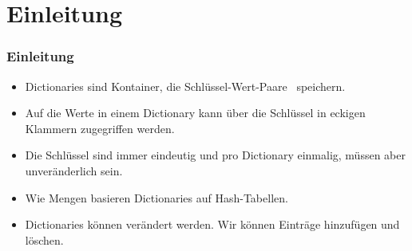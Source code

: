 \documentclass[aspectratio=169,mathserif,notheorems]{beamer}%
\subtitle{21.~Dictionaries bzw.\ Hash Maps}%
\begin{document}
%
%
\startPresentation%
%
\section{Einleitung}%
\begin{frame}[t]%
\frametitle{Einleitung}%
%
\begin{itemize}%
\item Dictionaries sind Kontainer, die Schlüssel-Wert-Paare~ speichern.%
%
\item<2-> Auf die Werte in einem Dictionary kann über die Schlüssel in eckigen Klammern zugegriffen werden.%
%
\item<3-> Die Schlüssel sind immer eindeutig und pro Dictionary einmalig, müssen aber unveränderlich sein.%
%
\item<5-> Wie Mengen basieren Dictionaries auf Hash-Tabellen\cite{K1998SAS,CLRS2009ITA,SKS2019DSC}.
%
\item<6-> Dictionaries können verändert werden. Wir können Einträge hinzufügen und löschen.%
\end{itemize}%
%
%
%
\end{frame}%
%
%
\end{document}
